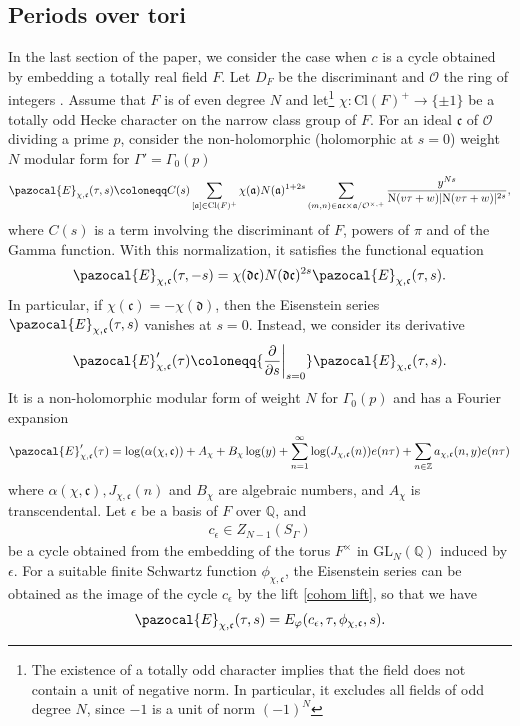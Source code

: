 \documentclass[twoside,a4paper,10pt]{article} %
\newcommand{\dds}{\restr{\frac{\partial}{\partial s}}{s=0}}
\newcommand{\8}{\infty}
\newcommand{\Z}{\mathbb{Z}}
\newcommand{\GL}{\mathrm{GL}}
\newcommand{\Q}{\mathbb{Q}}
\newcommand{\afrak}{\mathfrak{a}}
\newcommand{\dfrak}{\mathfrak{d}}
\newcommand{\cfrak}{\mathfrak{c}}
\newcommand{\N}{\mathrm{N}}
\newcommand{\Ocal}{\mathcal{O}}
\newcommand{\Cl}{\textrm{Cl}}
\newcommand{\Ecal}{\pazocal{E}}
\newcommand\restr[2]{{%
  \left.\kern-\nulldelimiterspace %
  #1 %
  \vphantom{\big|} %
  \right|_{#2} %
  }}
\theoremstyle{mytheoremstyle}
\theoremstyle{remark}
\numberwithin{equation}{section}
\begin{document}
\subsection{Periods over tori}
In the last section of the paper, we consider the case when $c$ is a cycle obtained by embedding a totally real field $F$.  Let $D_F$ be the discriminant and $\Ocal$ the ring of integers . Assume that $F$ is of even degree $N$ and let\footnote{The existence of a totally odd character implies that the field does not contain a unit of negative norm. In particular, it excludes all fields of odd degree $N$, since $-1$ is a unit of norm $(-1)^N$} $\chi \colon \Cl(F)^+ \longrightarrow \{ \pm 1\}$ be a totally odd Hecke character on the narrow class group of $F$. For an ideal $\cfrak$ of $\Ocal$ dividing a prime $p$, consider the non-holomorphic (holomorphic at $s=0$) weight $N$ modular form for $\Gamma'=\Gamma_0(p)$
\begin{align}
\Ecal_{\chi,\cfrak}(\tau,s) \coloneqq C(s) \sum_{[\afrak] \in \Cl(F)^+}\chi(\afrak) N(\afrak)^{1+2s} \sum_{(m,n) \in \afrak\cfrak \times \afrak /\Ocal^{\times,+}} \frac{y^{Ns}}{\N(v\tau+w) \vert \N(v\tau+w) \vert^{2s}},
\end{align}
where $C(s)$ is a term involving the discriminant of $F$, powers of $\pi$ and of the Gamma function. With this normalization, it satisfies the functional equation
\begin{align}
\Ecal_{\chi,\cfrak}(\tau,-s)=\chi(\dfrak\cfrak)N(\dfrak\cfrak)^{2s}\Ecal_{\chi,\cfrak}(\tau,s).
\end{align}
In particular, if $\chi(\cfrak)=-\chi(\dfrak)$, then the Eisenstein series $\Ecal_{\chi,\cfrak}(\tau,s)$ vanishes at $s=0$. Instead, we consider its derivative
\begin{align}
\Ecal'_{\chi,\cfrak}(\tau) \coloneqq \dds \Ecal_{\chi,\cfrak}(\tau,s).
\end{align}
It is a non-holomorphic modular form of weight $N$ for $\Gamma_0(p)$ and has a Fourier expansion
\begin{align}
\Ecal'_{\chi,\cfrak}(\tau)= \log(\alpha(\chi,\cfrak))+A_{\chi}+B_{\chi}\log(y)+\sum_{n=1}^\8\log(J_{\chi,\cfrak}(n))e(n \tau) + \sum_{n \in \Z} a_{\chi,\cfrak}(n,y)e(n \tau)
\end{align}
where $\alpha(\chi,\cfrak), J_{\chi,\cfrak}(n)$ and $B_{\chi}$ are algebraic numbers, and $A_{\chi}$ is transcendental. Let $\epsilon$ be a basis of $F$ over $\Q$, and 
\begin{align}
c_\epsilon \in Z_{N-1}(S_\Gamma)
\end{align} be a cycle obtained from the embedding of the torus $F^\times$ in $\GL_N(\Q)$ induced by $\epsilon$. For a suitable finite Schwartz function $\phi_{\chi,\cfrak}$, the Eisenstein series can be obtained as the image of the cycle $c_\epsilon$ by the lift \eqref{cohom lift}, so that we have
\begin{align}
\Ecal_{\chi,\cfrak}(\tau,s)=E_\varphi(c_\epsilon,\tau,\phi_{\chi,\cfrak},s).
\end{align}
\end{document}
